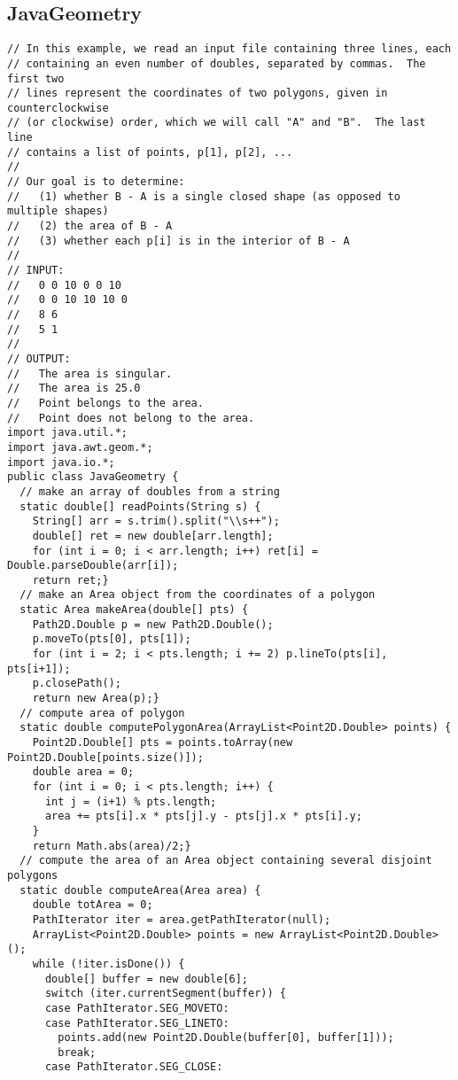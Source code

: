 \documentclass[8pt, oneside]{extarticle}
\begin{document}
\begin{multicols}{3}
\subsection{JavaGeometry}
\begin{lstlisting}
// In this example, we read an input file containing three lines, each
// containing an even number of doubles, separated by commas.  The first two
// lines represent the coordinates of two polygons, given in counterclockwise 
// (or clockwise) order, which we will call "A" and "B".  The last line 
// contains a list of points, p[1], p[2], ...
//
// Our goal is to determine:
//   (1) whether B - A is a single closed shape (as opposed to multiple shapes)
//   (2) the area of B - A
//   (3) whether each p[i] is in the interior of B - A
//
// INPUT:
//   0 0 10 0 0 10
//   0 0 10 10 10 0
//   8 6
//   5 1
//
// OUTPUT:
//   The area is singular.
//   The area is 25.0
//   Point belongs to the area.
//   Point does not belong to the area.
import java.util.*;
import java.awt.geom.*;
import java.io.*;
public class JavaGeometry {
  // make an array of doubles from a string
  static double[] readPoints(String s) {
    String[] arr = s.trim().split("\\s++");
    double[] ret = new double[arr.length];
    for (int i = 0; i < arr.length; i++) ret[i] = Double.parseDouble(arr[i]);
    return ret;}
  // make an Area object from the coordinates of a polygon
  static Area makeArea(double[] pts) {
    Path2D.Double p = new Path2D.Double();
    p.moveTo(pts[0], pts[1]);
    for (int i = 2; i < pts.length; i += 2) p.lineTo(pts[i], pts[i+1]);
    p.closePath();
    return new Area(p);}
  // compute area of polygon
  static double computePolygonArea(ArrayList<Point2D.Double> points) {
    Point2D.Double[] pts = points.toArray(new Point2D.Double[points.size()]);  
    double area = 0;
    for (int i = 0; i < pts.length; i++) {
      int j = (i+1) % pts.length;
      area += pts[i].x * pts[j].y - pts[j].x * pts[i].y;
    }        
    return Math.abs(area)/2;}
  // compute the area of an Area object containing several disjoint polygons
  static double computeArea(Area area) {
    double totArea = 0;
    PathIterator iter = area.getPathIterator(null);
    ArrayList<Point2D.Double> points = new ArrayList<Point2D.Double>();
    while (!iter.isDone()) {
      double[] buffer = new double[6];
      switch (iter.currentSegment(buffer)) {
      case PathIterator.SEG_MOVETO:
      case PathIterator.SEG_LINETO:
        points.add(new Point2D.Double(buffer[0], buffer[1]));
        break;
      case PathIterator.SEG_CLOSE:

\end{lstlisting}
\end{multicols}
\end{document}
